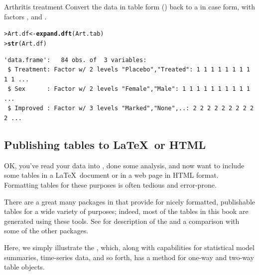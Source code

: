 \documentclass[10pt,krantz2]{krantz}\usepackage[]{graphicx}\usepackage[]{color}
\makeatletter
\newcommand{\hlstd}[1]{\textcolor[rgb]{0.345,0.345,0.345}{#1}}%
\newcommand{\hlkwb}[1]{\textcolor[rgb]{0.69,0.353,0.396}{#1}}%
\newcommand{\hlkwd}[1]{\textcolor[rgb]{0.737,0.353,0.396}{\textbf{#1}}}%
\newenvironment{kframe}{%
 \def\at@end@of@kframe{}%
 \ifinner\ifhmode%
  \def\at@end@of@kframe{\end{minipage}}%
  \begin{minipage}{\columnwidth}%
 \fi\fi%
 \def\FrameCommand##1{\hskip\@totalleftmargin \hskip-\fboxsep
 \colorbox{shadecolor}{##1}\hskip-\fboxsep
     \hskip-\linewidth \hskip-\@totalleftmargin \hskip\columnwidth}%
 \MakeFramed {\advance\hsize-\width
   \@totalleftmargin\z@ \linewidth\hsize
   \@setminipage}}%
 {\par\unskip\endMakeFramed%
 \at@end@of@kframe}
\newenvironment{knitrout}{}{} %
\renewenvironment{knitrout}{\small\renewcommand{\baselinestretch}{.85}}{} %
\makeatother
\begin{document}
\begin{Example}{Arthritis treatment}
Convert the  data in table form () back to a 
in case form, with factors
,  and .
\begin{knitrout}\footnotesize
{}\color{fgcolor}\begin{kframe}
\begin{alltt}
\hlstd{> }\hlstd{Art.df} \hlkwb{<-} \hlkwd{expand.dft}\hlstd{(Art.tab)}
\hlstd{> }\hlkwd{str}\hlstd{(Art.df)}
\end{alltt}
\begin{verbatim}
'data.frame':	84 obs. of  3 variables:
 $ Treatment: Factor w/ 2 levels "Placebo","Treated": 1 1 1 1 1 1 1 1 1 1 ...
 $ Sex      : Factor w/ 2 levels "Female","Male": 1 1 1 1 1 1 1 1 1 1 ...
 $ Improved : Factor w/ 3 levels "Marked","None",..: 2 2 2 2 2 2 2 2 2 2 ...
\end{verbatim}
\end{kframe}
\end{knitrout}
\end{Example}

\subsection{Publishing tables to \LaTeX\ or HTML}
OK, you've read your data into \R, done some analysis, and now want to
include some tables in a \LaTeX\ document or in a web page in HTML format.
Formatting tables for these purposes is often tedious and error-prone.

There are a great many packages in \R that provide for nicely formatted,
publishable tables for a wide variety of purposes; indeed, most of the tables
in this book are generated using these tools.
See \citet{Leifeld:2013:JSS} for description of the 
and a comparison with some of the other packages.

Here, we simply illustrate the , which, along with
capabilities for statistical model summaries, time-series data, and
so forth, has a  method for one-way and two-way
table objects.
\end{document}
